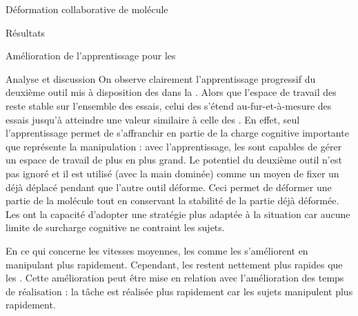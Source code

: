\documentclass[myfrancais]{mythesis}
\begin{document}
\begin{mychapter}{Déformation collaborative de molécule}
\begin{mysection}{Résultats}
\begin{mysubsection}{Amélioration de l'apprentissage pour les }
\begin{mysubsubsection}{Analyse et discussion}
					On observe clairement l'apprentissage progressif du deuxième outil mis à disposition des  dans la .
					Alors que l'espace de travail des  reste stable sur l'ensemble des essais, celui des  s'étend au-fur-et-à-mesure des essais jusqu'à atteindre une valeur similaire à celle des .
					En effet, seul l'apprentissage permet de s'affranchir en partie de la charge cognitive importante que représente la manipulation   : avec l'apprentissage, les  sont capables de gérer un espace de travail de plus en plus grand.
					Le potentiel du deuxième outil n'est pas ignoré et il est utilisé (avec la main dominée) comme un moyen de fixer un  déjà déplacé pendant que l'autre outil déforme.
					Ceci permet de déformer une partie de la molécule tout en conservant la stabilité de la partie déjà déformée.
					Les  ont la capacité d'adopter une stratégie plus adaptée à la situation car aucune limite de surcharge cognitive ne contraint les sujets.

					En ce qui concerne les vitesses moyennes, les  comme les  s'améliorent en manipulant plus rapidement.
					Cependant, les  restent nettement plus rapides que les .
					Cette amélioration peut être mise en relation avec l'amélioration des temps de réalisation : la tâche est réalisée plus rapidement car les sujets manipulent plus rapidement.


\end{mysubsubsection}
\end{mysubsection}
\end{mysection}
\end{mychapter}
\end{document}
